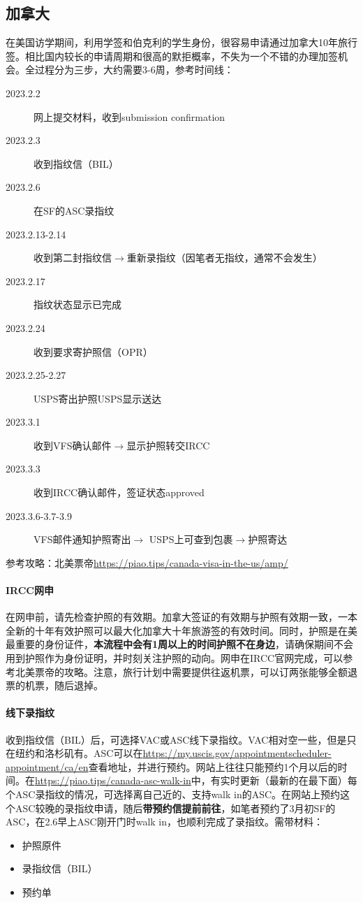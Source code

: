 \subsection{加拿大}
在美国访学期间，利用学签和伯克利的学生身份，很容易申请通过加拿大10年旅行签。相比国内较长的申请周期和很高的默拒概率，不失为一个不错的办理加签机会。全过程分为三步，大约需要3-6周，参考时间线：
\begin{description}
    \item[2023.2.2] 网上提交材料，收到submission confirmation
    \item[2023.2.3] 收到指纹信（BIL）
    \item[2023.2.6] 在SF的ASC录指纹
    \item[2023.2.13-2.14] 收到第二封指纹信$\to$重新录指纹（因笔者无指纹，通常不会发生）
    \item[2023.2.17] 指纹状态显示已完成
    \item[2023.2.24] 收到要求寄护照信（OPR）
    \item[2023.2.25-2.27] USPS寄出护照USPS显示送达
    \item[2023.3.1] 收到VFS确认邮件$\to$显示护照转交IRCC
    \item[2023.3.3] 收到IRCC确认邮件，签证状态approved
    \item[2023.3.6-3.7-3.9] VFS邮件通知护照寄出$\to$ USPS上可查到包裹$\to$护照寄达  
\end{description}
参考攻略：北美票帝\url{https://piao.tips/canada-visa-in-the-us/amp/}
    
\paragraph*{IRCC网申} 在网申前，请先检查护照的有效期。加拿大签证的有效期与护照有效期一致，一本全新的十年有效护照可以最大化加拿大十年旅游签的有效时间。同时，护照是在美最重要的身份证件，\textbf{本流程中会有1周以上的时间护照不在身边}，请确保期间不会用到护照作为身份证明，并时刻关注护照的动向。网申在IRCC官网完成，可以参考北美票帝的攻略。注意，旅行计划中需要提供往返机票，可以订两张能够全额退票的机票，随后退掉。

\paragraph*{线下录指纹} 收到指纹信（BIL）后，可选择VAC或ASC线下录指纹。VAC相对空一些，但是只在纽约和洛杉矶有。ASC可以在\url{https://my.uscis.gov/appointmentscheduler-appointment/ca/en}查看地址，并进行预约。网站上往往只能预约1个月以后的时间。在\url{https://piao.tips/canada-asc-walk-in}中，有实时更新（最新的在最下面）每个ASC录指纹的情况，可选择离自己近的、支持walk in的ASC。在网站上预约这个ASC较晚的录指纹申请，随后\textbf{带预约信提前前往}，如笔者预约了3月初SF的ASC，在2.6早上ASC刚开门时walk in，也顺利完成了录指纹。需带材料：
\begin{itemize}
    \item 护照原件
    \item 录指纹信（BIL）
    \item 预约单
\end{itemize}


